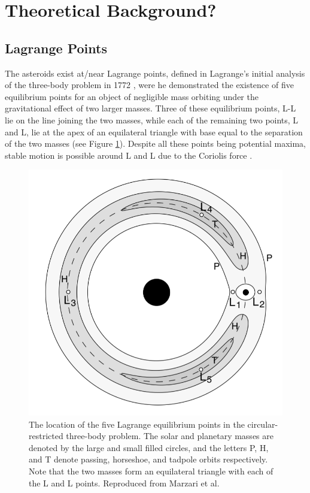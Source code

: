 \documentclass[11pt, a4paper,twocolumn]{article} %
\begin{document}

\section{Theoretical Background?}

\subsection{Lagrange Points} \label{lagrange}
The asteroids exist at/near Lagrange points, defined in Lagrange's initial analysis of the three-body problem in 1772 \cite{Lagrange1772}, were he demonstrated the existence of five equilibrium points for an object of negligible mass orbiting under the gravitational effect of two larger masses. Three of these equilibrium points, L-L lie on the line joining the two masses, while each of the remaining two points, L and L, lie at the apex of an equilateral triangle with base equal to the separation of the two masses (see Figure \ref{fig:lagrangepoints}). Despite all these points being potential maxima, stable motion is possible around L and L due to the Coriolis force \cite{Lissauer2014}.

\begin{figure}[h]
	\centering
	\includegraphics[width=\linewidth]{Figures/lagrange_points}
	\caption{The location of the five Lagrange equilibrium points in the circular-restricted three-body problem. The solar and planetary masses are denoted by the large and small filled circles, and the letters P, H, and T denote passing, horseshoe, and tadpole orbits respectively. Note that the two masses form an equilateral triangle with each of the L and L points. Reproduced from Marzari et al. \cite{Marzari2002}}
	\label{fig:lagrangepoints}
\end{figure}
\end{document}
